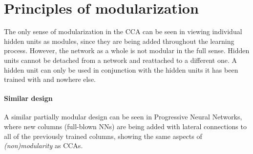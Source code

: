 \documentclass[a4paper,twocolumn]{article}
\begin{document}
\section{Principles of modularization}
The only sense of modularization in the CCA can be seen in viewing individual hidden units as modules, since they are being added throughout the learning process. However, the network as a whole is not modular in the full sense. Hidden units cannot be detached from a network and reattached to a different one. A hidden unit can only be used in conjunction with the hidden units it has been trained with and nowhere else.
\paragraph{Similar design}
A similar partially modular design can be seen in Progressive Neural Networks, where new columns (full-blown NNs) are being added with lateral connections to all of the previously trained columns, showing the same aspects of \textit{(non)modularity} as CCAs.
\end{document}
